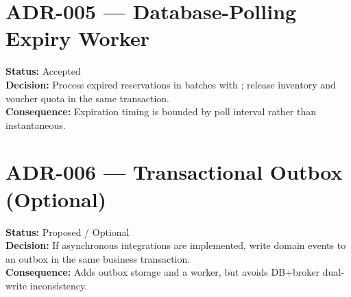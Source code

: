 \section{ADR-005 --- Database-Polling Expiry Worker}
\textbf{Status:} Accepted\\
\textbf{Decision:} Process expired reservations in batches with ; release inventory and voucher quota in the same transaction.\\
\textbf{Consequence:} Expiration timing is bounded by poll interval rather than instantaneous.

\section{ADR-006 --- Transactional Outbox (Optional)}
\textbf{Status:} Proposed / Optional\\
\textbf{Decision:} If asynchronous integrations are implemented, write domain events to an outbox in the same business transaction.\\
\textbf{Consequence:} Adds outbox storage and a worker, but avoids DB+broker dual-write inconsistency.
